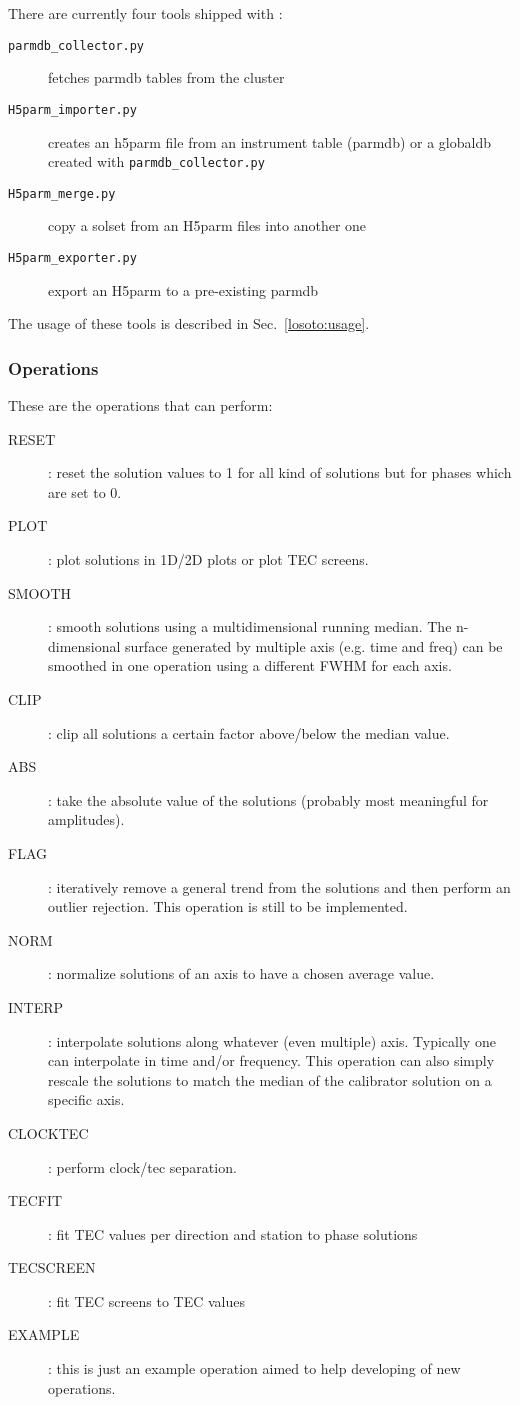\documentclass[structabstract]{article}
\begin{document}
There are currently four tools shipped with \losoto{}:
\begin{description}
 \item[\texttt{parmdb\_collector.py}] fetches parmdb tables from the cluster
 \item[\texttt{H5parm\_importer.py}] creates an h5parm file from an instrument table (parmdb) or a globaldb created with \texttt{parmdb\_collector.py}
 \item[\texttt{H5parm\_merge.py}] copy a solset from an H5parm files into another one
 \item[\texttt{H5parm\_exporter.py}] export an H5parm to a pre-existing parmdb
\end{description}

The usage of these tools is described in Sec.~\ref{losoto:usage}.

\subsubsection{Operations}
\label{losoto:operations}

These are the operations that \losoto{} can perform:
\begin{description}
 \item[RESET]: reset the solution values to 1 for all kind of solutions but for phases which are set to 0.
 \item[PLOT]: plot solutions in 1D/2D plots or plot TEC screens.
 \item[SMOOTH]: smooth solutions using a multidimensional running median. The n-dimensional surface generated by multiple axis (e.g. time and freq) can be smoothed in one operation using a different FWHM for each axis.
 \item[CLIP]: clip all solutions a certain factor above/below the median value.
 \item[ABS]: take the absolute value of the solutions (probably most meaningful for amplitudes).
 \item[FLAG]: iteratively remove a general trend from the solutions and then perform an outlier rejection. This operation is still to be implemented.
 \item[NORM]: normalize solutions of an axis to have a chosen average value.
 \item[INTERP]: interpolate solutions along whatever (even multiple) axis. Typically one can interpolate in time and/or frequency. This operation can also simply rescale the solutions to match the median of the calibrator solution on a specific axis.
 \item[CLOCKTEC]: perform clock/tec separation.
 \item[TECFIT]: fit TEC values per direction and station to phase solutions
 \item[TECSCREEN]: fit TEC screens to TEC values
 \item[EXAMPLE]: this is just an example operation aimed to help developing of new operations.
\end{description}
\end{document}
